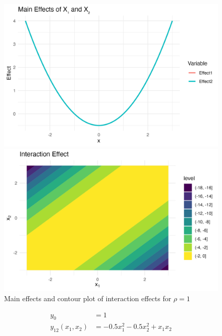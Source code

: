 \begin{figure}[htpb]
    \centering
    \begin{minipage}[t]{0.49\textwidth}
        \centering
        \includegraphics[width=\textwidth]{images/interaction_a1p00_a2p00_a11p00_a22p00_a12p10_rhop10_main.png}
    \end{minipage}%
    \hfill
    \begin{minipage}[t]{0.49\textwidth}
        \centering
        \includegraphics[width=\textwidth]{images/interaction_a1p00_a2p00_a11p00_a22p00_a12p10_rhop10_interaction.png}
    \end{minipage}
    \caption{Main effects and contour plot of interaction effects for $\rho = 1$}
    \label{fig:interaction_rho_1}
\end{figure}
\begin{align*}
y_0 &= 1 \\[3pt]
y_{12}(x_1,x_2) &= -0.5x_1^2 - 0.5x_2^2 + x_1x_2
\end{align*}


